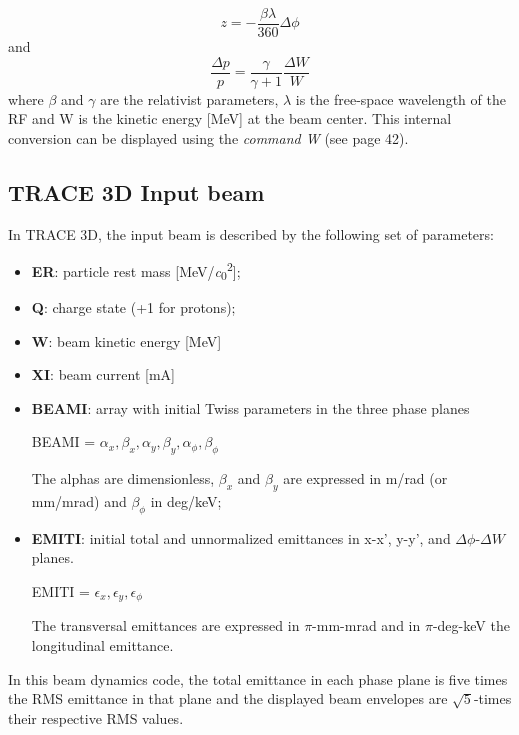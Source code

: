 \begin{equation}
z = -\frac{\beta\lambda}{360}\Delta\phi
\end{equation}
and
\begin{equation}
\frac{\Delta p}{p} = \frac{\gamma}{\gamma +1}\frac{\Delta W}{W}
\end{equation}
where $\beta$ and $\gamma$ are the relativist parameters, $\lambda$ is the free-space wavelength of the RF and W is the kinetic energy [\si{\mega\electronvolt}] at the beam center. This internal conversion can be displayed using the \textit{command W} (see \cite{Trace_man} page 42).
\subsection{TRACE 3D Input beam}
\label{ssec:T3D_input}
In TRACE 3D, the input beam is described by the following set of parameters:
\begin{itemize}
\item \textbf{ER}: particle rest mass [\si{\mega\electronvolt/\square\clight}];
\item \textbf{Q}: charge state (+1 for protons);
\item \textbf{W}: beam kinetic energy [\si{\mega\electronvolt}]
\item \textbf{XI}: beam current [\si{\milli\ampere}]
\item \textbf{BEAMI}: array with initial Twiss parameters in the three phase planes
\begin{center}
BEAMI = $\alpha_x , \beta_x, \alpha_y, \beta_y, \alpha_{\phi}, \beta_{\phi} $ \\
\end{center}
The alphas are dimensionless, $\beta_x$ and $\beta_y$ are expressed in m/rad (or mm/mrad) and $\beta_{\phi}$ in deg/keV;
\item \textbf{EMITI}: initial total and unnormalized emittances in x-x', y-y', and $\Delta\phi$-$\Delta W$ planes.
\begin{center}
EMITI = $\epsilon_x , \epsilon_y, \epsilon_{\phi} $ \\
\end{center}
The transversal emittances are expressed in $\pi$-mm-mrad and in $\pi$-deg-keV the longitudinal emittance.
\end{itemize}
In this beam dynamics code, the total emittance in each phase plane is five times the RMS emittance in that plane and the displayed beam envelopes are $\sqrt{5}$-times their respective RMS values.
